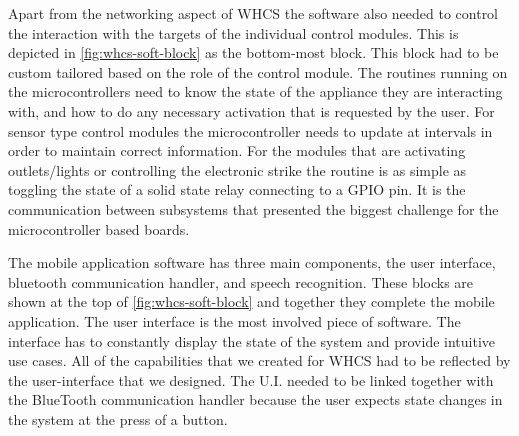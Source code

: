 {\color{black} Apart from the networking aspect of WHCS the software also
needed to control the interaction with the targets of the individual control
modules. This is depicted in \autoref{fig:whcs-soft-block} as the bottom{}-most block.
This block had to be custom tailored based on the role of the control
module. The routines running on the microcontrollers need to know the
state of the appliance they are interacting with, and how to do any necessary
activation that is requested by the user. For sensor type control modules the
microcontroller needs to update at intervals in order to maintain correct
information. For the modules that are activating outlets/lights or controlling
the electronic strike the routine is as simple as toggling the state of a
solid state relay connecting to a GPIO pin. It is the communication
between subsystems that presented the biggest challenge for the microcontroller
based boards.}

{\color{black} The mobile application software has three main components,
the user interface, bluetooth communication handler, and speech recognition.
These blocks are shown at the top of \autoref{fig:whcs-soft-block} and together they
complete the mobile application. The user interface is the most involved
piece of software. The interface has to constantly display the state of
the system and provide intuitive use cases. All of the capabilities that we
created for WHCS had to be reflected by the user{}-interface that we
designed. The U.I. needed to be linked together with the BlueTooth
communication handler because the user expects state changes in
the system at the press of a button.}

